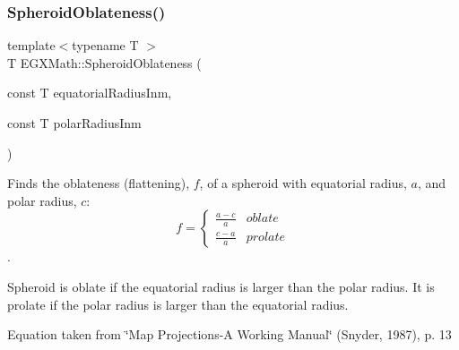 \subsubsection{\texorpdfstring{Spheroid\+Oblateness()}{SpheroidOblateness()}\hspace{0.1cm}{\footnotesize\ttfamily [1/2]}}
{\footnotesize\ttfamily template$<$typename T $>$ \\
T E\+G\+X\+Math\+::\+Spheroid\+Oblateness (\begin{DoxyParamCaption}\item[{const T}]{equatorial\+Radius\+Inm,  }\item[{const T}]{polar\+Radius\+Inm }\end{DoxyParamCaption})}



Finds the oblateness (flattening), $f$, of a spheroid with equatorial radius, $a$, and polar radius, $c$\+: \[ f =\begin{cases} \frac{a-c}{a}{} & oblate \\ \frac{c-a}{a} & prolate \end{cases} \]. 

Spheroid is oblate if the equatorial radius is larger than the polar radius. It is prolate if the polar radius is larger than the equatorial radius.

Equation taken from \char`\"{}\+Map Projections-\/\+A Working Manual\char`\"{} (Snyder, 1987), p. 13

